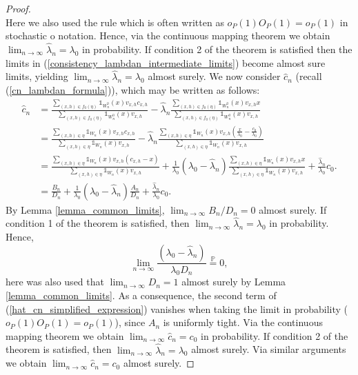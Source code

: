 \documentclass{article}
\newcommand{\PP}{\mathbb{P}}
\theoremstyle{plain}
\theoremstyle{remark}
\theoremstyle{definition}
\begin{document}
\begin{proof}
\begin{equation}
\end{equation}
Here we also used the rule which is often written as $o_P(1)O_P(1) = o_P(1)$ in stochastic o notation. Hence, via the continuous mapping theorem we obtain $\lim_{n \to \infty}\hat{\lambda}_n = \lambda_0$ in probability. If condition 2 of the theorem is satisfied then the limits in (\ref{consistency_lambdan_intermediate_limits}) become almost sure limits, yielding $\lim_{n \to \infty}\hat{\lambda}_n = \lambda_0$ almost surely. We now consider $\hat{c}_n$ (recall (\ref{cn_lambdan_formula})), which may be written as follows:
    \begin{align}
        \hat{c}_n &= \frac{\sum_{(x,h) \in f_0(\eta)} \mathds{1}_{W_n^0}(x)v_{x,h} c_{x,h}}{\sum_{(x,h) \in f_0(\eta)} \mathds{1}_{W_n^0}(x)v_{x,h}} - \hat{\lambda}_n \frac{\sum_{(x,h) \in f_0(\eta)} \mathds{1}_{W_n^0}(x)v_{x,h} x}{\sum_{(x,h) \in f_0(\eta)} \mathds{1}_{W_n^0}(x)v_{x,h}} \nonumber \\
        &= \frac{\sum_{(x,h) \in \eta} \mathds{1}_{W_n}(x)v_{x,h} c_{x,h}}{\sum_{(x,h) \in \eta} \mathds{1}_{W_n}(x)v_{x,h}} - \hat{\lambda}_n \frac{\sum_{(x,h) \in \eta} \mathds{1}_{W_n}(x)v_{x,h}\left(\frac{x}{\lambda_0} -\frac{c_0}{\lambda_0} \right)}{\sum_{(x,h) \in \eta} \mathds{1}_{W_n}(x)v_{x,h}}\nonumber\\
        &= \frac{\sum_{(x,h) \in \eta} \mathds{1}_{W_n}(x)v_{x,h} \left(c_{x,h}-x\right)}{\sum_{(x,h) \in \eta} \mathds{1}_{W_n}(x)v_{x,h}} + \frac{1}{\lambda_0}(\lambda_0 - \hat{\lambda}_n)\frac{\sum_{(x,h) \in \eta} \mathds{1}_{W_n}(x)v_{x,h}x}{\sum_{(x,h) \in \eta} \mathds{1}_{W_n}(x)v_{x,h}} + \frac{\hat{\lambda}_n}{\lambda_0}c_0.\nonumber\\
        &= \frac{B_n}{D_n} + \frac{1}{\lambda_0}(\lambda_0 - \hat{\lambda}_n)\frac{A_n}{D_n}+\frac{\hat{\lambda}_n}{\lambda_0}c_0.\label{hat_cn_simplified_expression}
    \end{align}
    By Lemma \ref{lemma_common_limits}, $\lim_{n \to \infty}B_n/D_n=0$ almost surely. If condition 1 of the theorem is satisfied, then $\lim_{n \to \infty}\hat{\lambda}_n=\lambda_0$ in probability. Hence, 
    \[\lim_{n \to \infty}\frac{(\lambda_0 - \hat{\lambda}_n)}{\lambda_0D_n} \overset{\PP}{=}0,\]
    here was also used that $\lim_{n \to \infty}D_n=1$ almost surely by Lemma \ref{lemma_common_limits}. As a consequence, the second term of (\ref{hat_cn_simplified_expression}) vanishes when taking the limit in probability ($o_P(1)O_P(1) = o_P(1)$), since $A_n$ is uniformly tight. Via the continuous mapping theorem we obtain $\lim_{n \to \infty} \hat{c}_n=c_0$ in probability. If condition 2 of the theorem is satisfied, then $\lim_{n \to \infty}\hat{\lambda}_n=\lambda_0$ almost surely. Via similar arguments we obtain $\lim_{n \to \infty} \hat{c}_n=c_0$ almost surely.
\end{proof}
\end{document}
